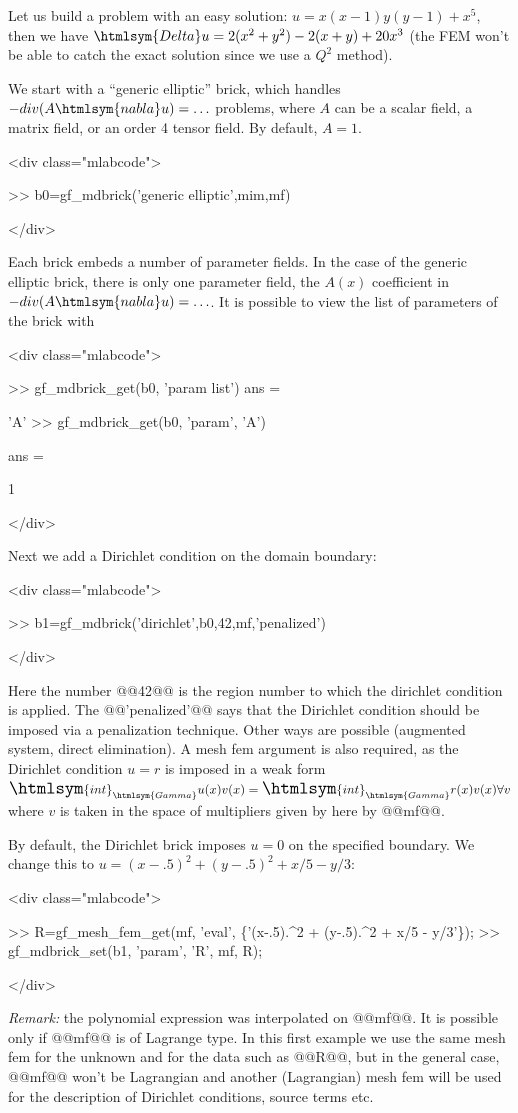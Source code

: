 \documentclass[11pt,a4paper]{article}
\newcommand{\nabla}{\htmlsym{nabla}}%
\newcommand{\Gamma}{\htmlsym{Gamma}}
\newcommand{\Delta}{\htmlsym{Delta}}
\newcommand{\int}{{\Large\htmlsym{int}}}
\newenvironment{matlab}{\begin{rawxml}<div class="mlabcode">\end{rawxml}\begin{example}}{\end{example}\begin{rawxml}</div>\end{rawxml}}
\newenvironment{matlab}{\begin{alltt}}{\end{alltt}}
\newcommand{\mf}{mesh fem\xspace}
\begin{document}
Let us build a problem with an easy solution: $u=x(x-1)y(y-1)+x^5$,
then we have $\Delta u=2(x^2+y^2)-2(x+y)+20x^3$ (the FEM won't be able to
catch the exact solution since we use a $Q^2$ method).


We start with a ``generic elliptic'' brick, which handles $-div(A\nabla u) = \ldots $ problems, where $A$ can be a scalar field, a matrix field, or an order 4 tensor field. By default, $A=1$.
\begin{matlab}
>> b0=gf_mdbrick('generic elliptic',mim,mf)
\end{matlab}

Each brick embeds a number of parameter fields. In the case of the generic elliptic brick, there is only one parameter field, the $A(x)$ coefficient in $-div(A\nabla u)= \ldots$. It is possible to view the list of parameters of the brick with
\begin{matlab}
>> gf_mdbrick_get(b0, 'param list')
ans =

    'A'
>> gf_mdbrick_get(b0, 'param', 'A')

ans =

     1
\end{matlab}

Next we add a Dirichlet condition on the domain boundary:
\begin{matlab}
>> b1=gf_mdbrick('dirichlet',b0,42,mf,'penalized')
\end{matlab}
Here the number @@42@@ is the region number to which the dirichlet condition is applied. The @@'penalized'@@ says that the Dirichlet condition should be imposed via a penalization technique. Other ways are possible (augmented system, direct elimination). A \mf argument is also required, as the Dirichlet condition $u=r$ is imposed in a weak form
$\int_\Gamma u(x)v(x) = \int_\Gamma r(x)v(x) \forall v$ where $v$ is taken in the space of multipliers given by here by @@mf@@.

By default, the Dirichlet brick imposes $u=0$ on the specified boundary. We change this to $u=(x-.5)^2+(y-.5)^2+x/5-y/3$:
\begin{matlab}
>> R=gf_mesh_fem_get(mf, 'eval', \{'(x-.5).^2 + (y-.5).^2 + x/5 - y/3'\});
>> gf_mdbrick_set(b1, 'param', 'R', mf, R); 
\end{matlab}
\textit{Remark:} the polynomial expression was interpolated on @@mf@@.
It is possible only if @@mf@@ is of Lagrange type. In this first
example we use the same \mf for the unknown and for the data such as
@@R@@, but in the general case, @@mf@@ won't be Lagrangian and another
(Lagrangian) \mf will be used for the description of Dirichlet
conditions, source terms etc.
\end{document}
